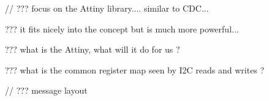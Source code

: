

// ??? focus on the Attiny library.... similar to CDC...

??? it fits nicely into the concept but is much more powerful...


??? what is the Attiny, what will it do for us ?


??? what is the common register map seen by I2C reads and writes ?


// ??? message layout 




